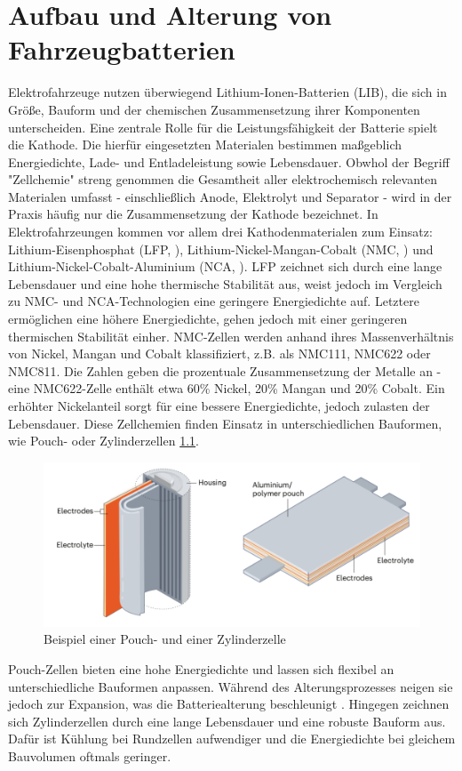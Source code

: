 

\chapter{Aufbau und Alterung von Fahrzeugbatterien}
Elektrofahrzeuge nutzen überwiegend Lithium-Ionen-Batterien (LIB), die sich in Größe, Bauform und der chemischen Zusammensetzung ihrer Komponenten unterscheiden. Eine zentrale Rolle für die Leistungsfähigkeit der Batterie spielt die Kathode. Die hierfür eingesetzten Materialen bestimmen maßgeblich Energiedichte, Lade- und Entladeleistung sowie Lebensdauer. Obwhol der Begriff "Zellchemie" streng genommen die Gesamtheit aller elektrochemisch relevanten Materialen umfasst - einschließlich Anode, Elektrolyt und Separator - wird in der Praxis häufig nur die Zusammensetzung der Kathode bezeichnet. In Elektrofahrzeungen kommen vor allem drei Kathodenmaterialen zum Einsatz: Lithium-Eisenphosphat (LFP, ),  Lithium-Nickel-Mangan-Cobalt (NMC, ) und Lithium-Nickel-Cobalt-Aluminium (NCA, ). LFP zeichnet sich durch eine lange Lebensdauer und eine hohe thermische Stabilität aus, weist jedoch im Vergleich zu NMC- und NCA-Technologien eine geringere Energiedichte auf. Letztere ermöglichen eine höhere Energiedichte, gehen jedoch mit einer geringeren thermischen Stabilität einher. NMC-Zellen werden anhand ihres Massenverhältnis von Nickel, Mangan und Cobalt klassifiziert, z.B. als NMC111, NMC622 oder NMC811. Die Zahlen geben die prozentuale Zusammensetzung der Metalle an - eine NMC622-Zelle enthält etwa 60\% Nickel, 20\% Mangan und 20\% Cobalt. Ein erhöhter Nickelanteil sorgt für eine bessere Energiedichte, jedoch zulasten der Lebensdauer. Diese Zellchemien finden Einsatz in unterschiedlichen Bauformen, wie Pouch- oder Zylinderzellen \ref{fig:pouch-zylinder-zelle}. 
\begin{figure}[H]
	\centering
	\includegraphics[height=0.25\linewidth]{resources/images/pouch-zylinder-zelle}
	\caption{Beispiel einer Pouch- und einer Zylinderzelle}
	\label{fig:pouch-zylinder-zelle}
\end{figure}
Pouch-Zellen bieten eine hohe Energiedichte und lassen sich flexibel an unterschiedliche Bauformen anpassen. Während des Alterungsprozesses neigen sie jedoch zur Expansion, was die Batteriealterung beschleunigt \cite{articlePouchZellenAlterung}. Hingegen zeichnen sich Zylinderzellen durch eine lange Lebensdauer und eine robuste Bauform aus. Dafür ist Kühlung bei Rundzellen aufwendiger und die Energiedichte bei gleichem Bauvolumen oftmals geringer.

